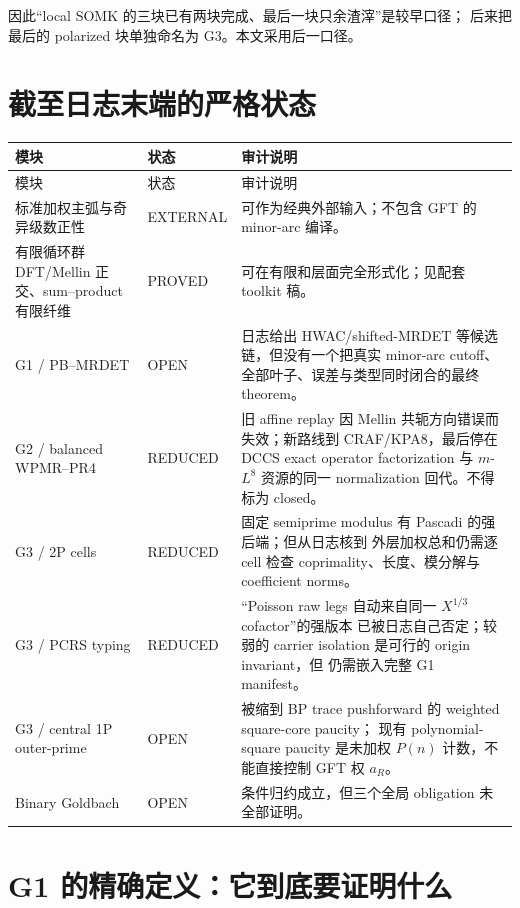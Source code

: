 \documentclass[11pt,a4paper]{ctexart}
\theoremstyle{definition}
\newcommand{\OPEN}{\textcolor{red!70!black}{\textsf{OPEN}}}
\newcommand{\REDUCED}{\textcolor{orange!80!black}{\textsf{REDUCED}}}
\newcommand{\PROVED}{\textcolor{green!45!black}{\textsf{PROVED}}}
\newcommand{\EXTERNAL}{\textcolor{blue!70!black}{\textsf{EXTERNAL}}}
\begin{document}
因此“local SOMK 的三块已有两块完成、最后一块只余渣滓”是较早口径；
后来把最后的 polarized 块单独命名为 G3。本文采用后一口径。

\section{截至日志末端的严格状态}

\begin{longtable}{p{}p{}p{}}
\toprule
模块 & 状态 & 审计说明\\
\midrule
\endfirsthead
\toprule
模块 & 状态 & 审计说明\\
\midrule
\endhead
标准加权主弧与奇异级数正性 & \EXTERNAL
& 可作为经典外部输入；不包含 GFT 的 minor-arc 编译。\\
有限循环群 DFT/Mellin 正交、sum--product 有限纤维
& \PROVED & 可在有限和层面完全形式化；见配套 toolkit 稿。\\
G1 / PB--MRDET
& \OPEN & 日志给出 HWAC/shifted-MRDET 等候选链，但没有一个把真实
minor-arc cutoff、全部叶子、误差与类型同时闭合的最终 theorem。\\
G2 / balanced WPMR--PR4
& \REDUCED & 旧 affine replay 因 Mellin 共轭方向错误而失效；新路线到
CRAF/KPA8，最后停在 DCCS exact operator factorization 与 $m$-$L^8$
资源的同一 normalization 回代。不得标为 closed。\\
G3 / 2P cells
& \REDUCED & 固定 semiprime modulus 有 Pascadi 的强后端；但从日志核到
外层加权总和仍需逐 cell 检查 coprimality、长度、模分解与 coefficient norms。\\
G3 / PCRS typing
& \REDUCED & “Poisson raw legs 自动来自同一 $X^{1/3}$ cofactor”的强版本
已被日志自己否定；较弱的 carrier isolation 是可行的 origin invariant，但
仍需嵌入完整 G1 manifest。\\
G3 / central 1P outer-prime
& \OPEN & 被缩到 BP trace pushforward 的 weighted square-core paucity；
现有 polynomial-square paucity 是未加权 $P(n)$ 计数，不能直接控制 GFT 权 $a_R$。\\
Binary Goldbach
& \OPEN & 条件归约成立，但三个全局 obligation 未全部证明。\\
\bottomrule
\end{longtable}

\section{G1 的精确定义：它到底要证明什么}
\end{document}
